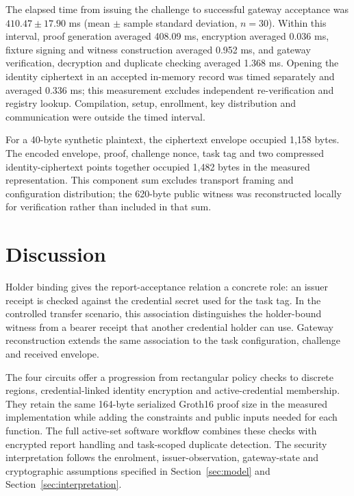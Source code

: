 \documentclass[pdflatex,iicol,sn-mathphys-num]{sn-jnl}
\begin{document}
The elapsed time from issuing the challenge to successful gateway acceptance was $410.47\pm17.90$ ms (mean $\pm$ sample standard deviation, $n=30$). Within this interval, proof generation averaged 408.09 ms, encryption averaged 0.036 ms, fixture signing and witness construction averaged 0.952 ms, and gateway verification, decryption and duplicate checking averaged 1.368 ms. Opening the identity ciphertext in an accepted in-memory record was timed separately and averaged 0.336 ms; this measurement excludes independent re-verification and registry lookup. Compilation, setup, enrollment, key distribution and communication were outside the timed interval.

For a 40-byte synthetic plaintext, the ciphertext envelope occupied 1,158 bytes. The encoded envelope, proof, challenge nonce, task tag and two compressed identity-ciphertext points together occupied 1,482 bytes in the measured representation. This component sum excludes transport framing and configuration distribution; the 620-byte public witness was reconstructed locally for verification rather than included in that sum.

\section{Discussion}
\label{sec:discussion}
Holder binding gives the report-acceptance relation a concrete role: an issuer receipt is checked against the credential secret used for the task tag. In the controlled transfer scenario, this association distinguishes the holder-bound witness from a bearer receipt that another credential holder can use. Gateway reconstruction extends the same association to the task configuration, challenge and received envelope.

The four circuits offer a progression from rectangular policy checks to discrete regions, credential-linked identity encryption and active-credential membership. They retain the same 164-byte serialized Groth16 proof size in the measured implementation while adding the constraints and public inputs needed for each function. The full active-set software workflow combines these checks with encrypted report handling and task-scoped duplicate detection. The security interpretation follows the enrolment, issuer-observation, gateway-state and cryptographic assumptions specified in Section~\ref{sec:model} and Section~\ref{sec:interpretation}.
\end{document}
